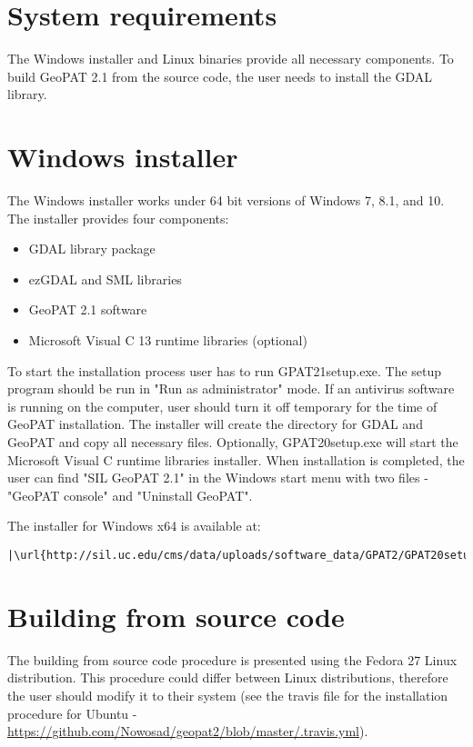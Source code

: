 \section{System requirements}

The Windows installer and Linux binaries provide all necessary components. 
To build GeoPAT 2.1 from the source code, the user needs to install the GDAL library.

\section{Windows installer}
The Windows installer works under 64 bit versions of Windows 7, 8.1, and 10.
The installer provides four components:
\begin{itemize}
  \item{GDAL library package}
  \item{ezGDAL and SML libraries}
  \item{GeoPAT 2.1 software}
  \item{Microsoft Visual C 13 runtime libraries (optional)}
\end{itemize}
To start the installation process user has to run GPAT21setup.exe.
The setup program should be run in "Run as administrator" mode.
If an antivirus software is running on the computer, user should turn it off temporary for the time of GeoPAT installation.
The installer will create the directory for GDAL and GeoPAT and copy all necessary files.
Optionally, GPAT20setup.exe will start the Microsoft Visual C runtime libraries installer.
When installation is completed, the user can find "SIL GeoPAT 2.1" in the Windows start menu with two files - "GeoPAT console" and "Uninstall GeoPAT".

The installer for Windows x64 is available at:

\begin{lstlisting}[escapechar=|]
|\url{http://sil.uc.edu/cms/data/uploads/software_data/GPAT2/GPAT20setup.exe}|
\end{lstlisting}

\section{Building from source code}

The building from source code procedure is presented using the Fedora 27 Linux distribution.
This procedure could differ between Linux distributions, therefore the user should modify it to their system (see the travis file for the installation procedure for Ubuntu - \url{https://github.com/Nowosad/geopat2/blob/master/.travis.yml}).

